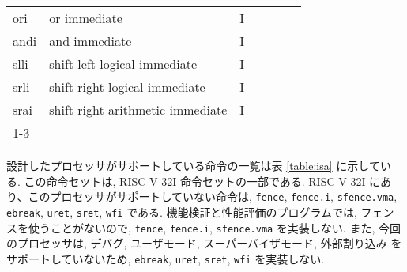 \documentclass[../specifications.tex]{subfiles}
\begin{document}
\begin{table*}[t]
\begin{tabular}{|l|l|l|llll}
    ori   & or immediate                          & I  &                       &                             &                                                    &                         \\
    andi  & and immediate                         & I  &                       &                             &                                                    &                         \\
    slli  & shift left logical immediate          & I  &                       &                             &                                                    &                         \\
    srli  & shift right logical immediate         & I  &                       &                             &                                                    &                         \\
    srai  & shift right arithmetic immediate      & I  &                       &                             &                                                    &                         \\ \cline{1-3}
    \end{tabular}
    \caption{命令セット}
    \label{table:isa}
  \end{table*}

  設計したプロセッサがサポートしている命令の一覧は表 \ref{table:isa} に示している.
  この命令セットは, RISC-V 32I 命令セットの一部である.
  RISC-V 32I にあり、このプロセッサがサポートしていない命令は, 
  \verb|fence|, \verb|fence.i|, \verb|sfence.vma|, \verb|ebreak|, 
  \verb|uret|, \verb|sret|, \verb|wfi| である.
  機能検証と性能評価のプログラムでは, フェンスを使うことがないので, 
  \verb|fence|, \verb|fence.i|, \verb|sfence.vma| を実装しない.
  また, 今回のプロセッサは, デバグ, ユーザモード, スーパーバイザモード, 外部割り込み
  をサポートしていないため, \verb|ebreak|, \verb|uret|, 
  \verb|sret|, \verb|wfi| を実装しない.
  
\end{document}
